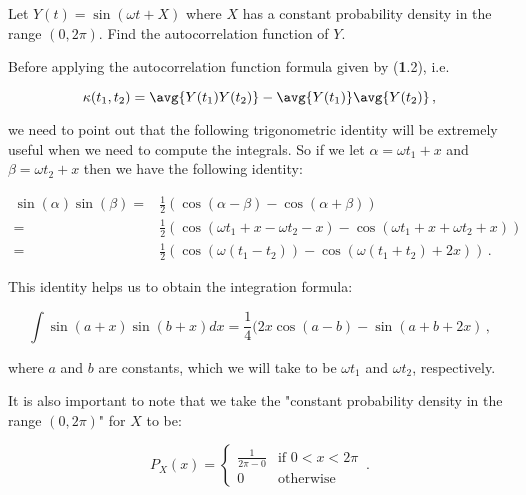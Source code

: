 

Let $Y(t) = \sin(\omega t + X)$ where $X$ has a constant probability density in the range $\left( 0, 2\pi \right)$. Find the autocorrelation function of $Y$. 

Before applying the autocorrelation function formula given by (\textbf{1}.2), i.e. 

\begin{equation*}
    \kappa(t_1 , t_2) = \avg{Y(t_1) Y(t_2)} - \avg{Y(t_1)} \avg{Y(t_2)}
    \, ,
\end{equation*}

we need to point out that the following trigonometric identity will be extremely useful when we need to compute the integrals. So if we let $\alpha = \omega t_1 + x$ and $\beta = \omega t_2 + x$ then we have the following identity: 

\begin{align*}
    \sin(\alpha)\sin(\beta) = & \frac{1}{2} (\cos(\alpha - \beta) - \cos(\alpha + \beta) ) \\
    = &  \frac{1}{2} (\cos(\omega t_1 + x - \omega t_2 - x) - \cos(\omega t_1 + x + \omega t_2 + x) ) \\
    = & \frac{1}{2} ( \cos(\omega(t_1 - t_2 ) ) - \cos(\omega(t_1 + t_2 ) + 2x) ) 
    \, .
\end{align*}

This identity helps us to obtain the integration formula: 

\begin{equation*}
    \int \sin(a + x) \sin(b + x) dx = \frac{1}{4} (2x \cos(a-b) - \sin(a + b + 2x)
    \, ,
\end{equation*}

where $a$ and $b$ are constants, which we will take to be $\omega t_1$ and $\omega t_2$, respectively. 

It is also important to note that we take the "constant probability density in the range $(0, 2\pi)$" for $X$ to be:

\begin{equation*}
    P_{X}(x)=
    \begin{cases}
        \frac{1}{2\pi - 0} & \text{if } 0 < x < 2\pi\\
        0 & \text{otherwise}
    \end{cases}
    \, .
\end{equation*}

